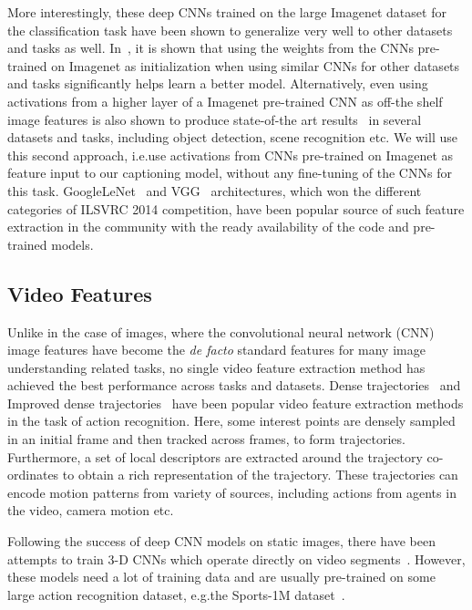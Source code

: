 More interestingly, these deep CNNs trained on the large Imagenet dataset for
the classification task have been shown to generalize very well to other
datasets and tasks as well.
In~\cite{yosinski2014transferable}, it is shown that using the weights from the
CNNs pre-trained on Imagenet as initialization when using similar CNNs for other
datasets and tasks significantly helps learn a better model.
Alternatively, even using activations from a higher layer of a Imagenet
pre-trained CNN as off-the shelf image features is also shown to produce
state-of-the art results~\cite{Donahue2014,Razavian2014CVPR} in several datasets
and tasks, including object detection, scene recognition etc.
We will use this second approach, i.e.\@ use activations from CNNs pre-trained
on Imagenet as feature input to our captioning model, without any fine-tuning of
the CNNs for this task.
GoogleLeNet~\cite{DBLP:journals/corr/SzegedyLJSRAEVR14} and
VGG~\cite{Simonyan14c} architectures, which won the different categories of
ILSVRC 2014 competition, have been popular source of such feature extraction in
the community with the ready availability of the code and pre-trained models.

\subsection{Video Features}
Unlike in the case of images, where the convolutional neural network (CNN) image
features have become the \emph{de facto} standard features for many image
understanding related tasks, no single video feature extraction method has
achieved the best performance across tasks and datasets.
Dense trajectories~\cite{DBLP:conf/cvpr/WangKSL11} and Improved dense
trajectories~\cite{Wang2013} have been popular video feature extraction methods
in the task of action recognition.
Here, some interest points are densely sampled in an initial frame and then tracked
across frames, to form trajectories.
Furthermore, a set of local descriptors are extracted around the trajectory
co-ordinates to obtain a rich representation of the trajectory.
These trajectories can encode motion patterns from variety of sources, including
actions from agents in the video, camera motion etc.

Following the success of deep CNN models on static images, there have been
attempts to train 3-D CNNs which operate directly on video
segments~\cite{3dCNN_ji2013, KarpathyCVPR14, DBLP:C3D}.
However, these models need a lot of training data and are usually pre-trained on
some large action recognition dataset, e.g.\@ the Sports-1M
dataset~\cite{KarpathyCVPR14}.


